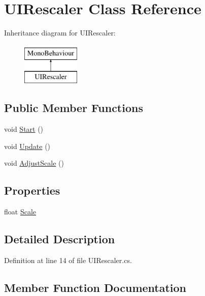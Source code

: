 \hypertarget{class_u_i_rescaler}{}\section{U\+I\+Rescaler Class Reference}
\label{class_u_i_rescaler}
Inheritance diagram for U\+I\+Rescaler\+:\begin{figure}[H]
\begin{center}
\leavevmode
\includegraphics[height=2.000000cm]{class_u_i_rescaler}
\end{center}
\end{figure}
\subsection*{Public Member Functions}
\begin{DoxyCompactItemize}
\item 
void \hyperlink{class_u_i_rescaler_a57cf9e52eff852bdf1494a62c196205c}{Start} ()
\item 
void \hyperlink{class_u_i_rescaler_a45ffe32f3e0a597b2ed3331578d9a921}{Update} ()
\item 
void \hyperlink{class_u_i_rescaler_ac8b875080c7c18b1d70514e68d7c306f}{Adjust\+Scale} ()
\end{DoxyCompactItemize}
\subsection*{Properties}
\begin{DoxyCompactItemize}
\item 
float \hyperlink{class_u_i_rescaler_a7b328eb24eeae49bd82c1c332dd536d8}{Scale}
\end{DoxyCompactItemize}


\subsection{Detailed Description}


Definition at line 14 of file U\+I\+Rescaler.\+cs.



\subsection{Member Function Documentation}
\mbox{\label{class_u_i_rescaler_ac8b875080c7c18b1d70514e68d7c306f}} 
